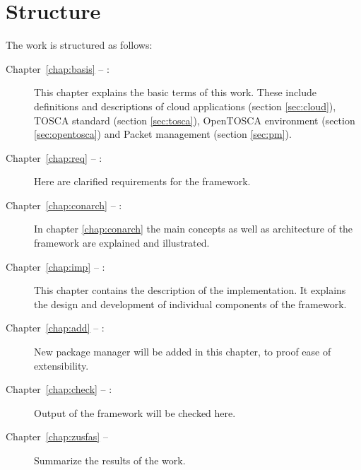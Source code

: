 \section*{Structure}
The work is structured as follows:
\begin{description}
\item[Chapter~\ref{chap:basis} -- :] This chapter explains the basic terms of this work. These include definitions and descriptions of cloud applications (section \ref{sec:cloud}), TOSCA standard (section \ref{sec:tosca}), OpenTOSCA environment  (section \ref{sec:opentosca}) and Packet management (section \ref{sec:pm}).
\item[Chapter~\ref{chap:req} -- :] Here are clarified requirements for the framework.
\item[Chapter~\ref{chap:conarch} -- :] In chapter \ref{chap:conarch} the main concepts as well as architecture of the framework are explained and illustrated.
\item[Chapter~\ref{chap:imp} -- :] This chapter contains the description of the implementation.
 It explains the design and development of individual components of the framework. 
\item[Chapter~\ref{chap:add} -- :] New package manager will be added in this chapter, to proof ease of extensibility. 
\item[Chapter~\ref{chap:check} -- :] Output of the framework will be checked here.
\item[Chapter~\ref{chap:zusfas} -- ] Summarize the results of the work.
\end{description}
